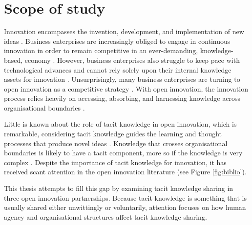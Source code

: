  \section{Scope of study}

Innovation encompasses the invention, development, and implementation of new ideas \citep{garud2013perspectives}. Business enterprises are increasingly obliged to engage in continuous innovation in order to remain competitive in an ever-demanding, knowledge-based, economy \citep{lubit2001keys,urbancova2013competitive}. However, business enterprises also struggle to keep pace with technological advances and cannot rely solely upon their internal knowledge assets for innovation \citep{chesbrough2009open,enkel2009open}. Unsurprisingly, many business enterprises are turning to open innovation as a competitive strategy \citep{chesbrough2003open,enkel2009open,stanko2017under}. With open innovation, the innovation process relies heavily on accessing, absorbing, and harnessing knowledge across organisational boundaries \citep{chesbrough2017future}. \medskip

Little is known about the role of tacit knowledge in open innovation, which is remarkable, considering tacit knowledge guides the learning and thought processes that produce novel ideas \citep{leonard1998role}. Knowledge that crosses organisational boundaries is likely to have a tacit component, more so if the knowledge is very complex \citep{seidler2008use}. Despite the importance of tacit knowledge for innovation, it has received scant attention in the open innovation literature (see Figure \ref{fig:biblio}). \medskip

This thesis attempts to fill this gap by examining tacit knowledge sharing in three open innovation partnerships. Because tacit knowledge is something that is usually shared either unwittingly or voluntarily, attention focuses on how human agency and organisational structures affect tacit knowledge sharing. \medskip

